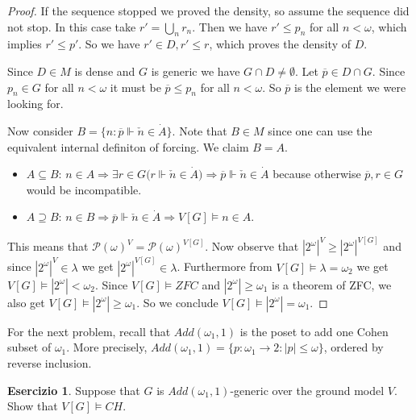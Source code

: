 \documentclass[a4paper,12pt]{article}
\theoremstyle{plain}
\theoremstyle{definition}
\newtheorem{esercizio}{Esercizio}
\theoremstyle{remark}
\begin{document}
\begin{proof}
			If the sequence stopped we proved the density, so assume the sequence did not stop. In this case take 
			$r' = \bigcup_{n} r_{n}$. Then we have $r' \leq p_n$ for all $n < \omega$, which implies $r' \leq p'$.
			So we have $r' \in D, r' \leq r$, which proves the density of $D$.

			Since $D \in M$ is dense and $G$ is generic we have $G \cap D \not = \emptyset$.
			Let $\overline{p} \in D \cap G$. Since $p_n \in G$ for all $n < \omega$ it must be $\overline{p} \leq p_n$ for all $n < \omega$.
			So $\overline{p}$ is the element we were looking for.

			Now consider $B = \{n : \overline{p} \Vdash \check{n} \in \dot{A}\}$. Note that $B \in M$ since one can use the equivalent 
			internal definiton of forcing. We claim $B = A$.

			\begin{itemize}
				\item $A \subseteq B$:
					$n \in A \Rightarrow \exists r \in G \big( r \Vdash \check{n} \in \dot{A} \big) \Rightarrow 
					\overline{p} \Vdash \check{n} \in \dot{A}$ because otherwise $\overline{p},r \in G$ would be incompatible.
				\item $A \supseteq B$:
					$n \in B \Rightarrow \overline{p} \Vdash \check{n} \in \dot{A} \Rightarrow V[G] \models n \in A$.
			\end{itemize}

			This means that $\mathcal{P}(\omega) ^V = \mathcal{P}(\omega) ^{V[G]}$.
			Now observe that $|2^{\omega}| ^V \geq |2^{\omega}|^{V[G]}$ and since $|2^{\omega}|^V \in \lambda$ we get 
			$|2^{\omega}|^{V[G]} \in \lambda$. Furthermore from $V[G] \models \lambda = \omega_2$ we get $V[G] \models |2^{\omega}| < \omega_2$.
			Since $V[G] \models ZFC$ and $|2^{\omega}| \geq \omega_1$ is a theorem of ZFC, we also get 
			$V[G] \models |2^{\omega}| \geq \omega_1$.
			So we conclude $V[G] \models |2^{\omega}| = \omega_1$.

\end{proof}



For the next problem, recall that $Add(\omega_1,1)$ is the poset to add one Cohen subset of $\omega_1$. More precisely,
$Add(\omega_1,1) = \{p: \omega_1 \to 2 : |p| \leq \omega\}$, ordered by reverse inclusion.

\begin{esercizio}

	Suppose that $G$ is $Add(\omega_1,1)$-generic over the ground model $V$. Show that $V[G] \models CH$.

\end{esercizio}
\end{document}
